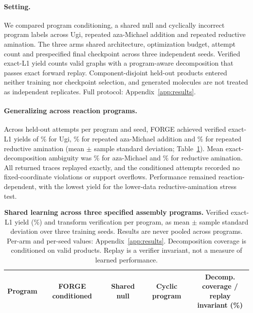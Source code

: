\documentclass{article}
\begin{document}
\paragraph{Setting.}
We compared program conditioning, a shared null and cyclically incorrect program labels across Ugi,
repeated aza-Michael addition and repeated reductive amination. The three arms shared architecture,
optimization budget, attempt count and prespecified final checkpoint across three independent seeds.
Verified exact-L1 yield counts valid graphs with a program-aware decomposition that passes exact
forward replay. Component-disjoint held-out products entered neither training nor checkpoint
selection, and generated molecules are not treated as independent replicates. Full protocol:
Appendix~\ref{app:results}.

\paragraph{Generalizing across reaction programs.}
Across \ForgeProseAttemptsPerProgram{} held-out attempts per program and seed, FORGE achieved verified exact-L1 yields of
\ForgeTableOneConditionedUgiYield\% for Ugi, \ForgeTableOneConditionedBLYield\% for repeated
aza-Michael addition and \ForgeTableOneConditionedLXYield\% for repeated reductive amination
(mean $\pm$ sample standard deviation; Table~\ref{tab:gem-shared-programs}). Mean exact-decomposition
ambiguity was \ForgeTableOneBLAmbiguityPercent\% for aza-Michael and
\ForgeTableOneLXAmbiguityPercent\% for reductive amination. All returned traces replayed exactly,
and the \ForgeProseConditionedTotalAttempts{} conditioned attempts recorded no fixed-coordinate
violations or support overflows. Performance remained reaction-dependent, with the lowest yield for
the lower-data reductive-amination stress test.

\begin{table}[t]
\caption{\textbf{Shared learning across three specified assembly programs.}
Verified exact-L1 yield (\%) and transform verification per program, as mean $\pm$ sample standard deviation
over three training seeds. Results are never pooled across programs. Per-arm and per-seed values:
Appendix~\ref{app:results}. Decomposition coverage is conditioned on valid products. Replay is a
verifier invariant, not a measure of learned performance.}
\label{tab:gem-shared-programs}
\centering
\small
\setlength{\tabcolsep}{4.6pt}
\begin{tabular}{@{}lcccc@{}}
\toprule
Program & FORGE conditioned & Shared null & Cyclic program &
\shortstack{Decomp. coverage /\\ replay invariant (\%)} \\
\midrule
\end{tabular}
\end{table}
\end{document}
